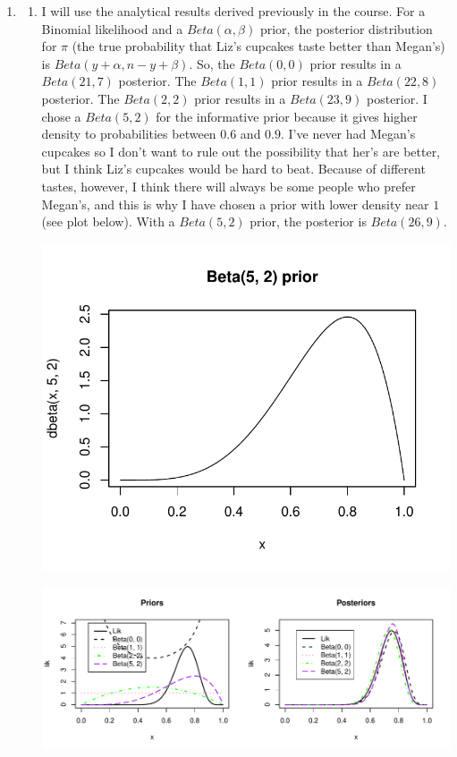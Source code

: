 \documentclass[12pt]{article}\usepackage[]{graphicx}\usepackage[]{color}
\newenvironment{knitrout}{}{} %
\begin{document}
\begin{doublespacing}
\begin{enumerate}
\item \begin{enumerate} 

\item I will use the analytical results derived previously in the course. For a Binomial likelihood and a $Beta(\alpha, \beta)$ prior, the posterior distribution for $\pi$ (the true probability that Liz's cupcakes taste better than Megan's) is $Beta(y + \alpha, n - y + \beta)$. So, the $Beta(0, 0)$ prior results in a $Beta(21, 7)$ posterior. The $Beta(1, 1)$ prior results in a $Beta(22, 8)$ posterior. The $Beta(2, 2)$ prior results in a $Beta(23, 9)$ posterior. I chose a $Beta(5, 2)$ for the informative prior because it gives higher density to probabilities between $0.6$ and $0.9$. I've never had Megan's cupcakes so I don't want to rule out the possibility that her's are better, but I think Liz's cupcakes would be hard to beat. Because of different tastes, however, I think there will always be some people who prefer Megan's, and this is why I have chosen a prior with lower density near $1$ (see plot below). With a $Beta(5, 2)$ prior, the posterior is $Beta(26, 9)$.

\begin{center}
\begin{knitrout}\footnotesize
{}\color{fgcolor}
\includegraphics[width=.5\linewidth]{figure/betainform-1} 

\end{knitrout}
\end{center}

\begin{knitrout}\footnotesize
{}\color{fgcolor}
\includegraphics[width=\linewidth]{figure/plots-1} 


\end{knitrout}
\end{enumerate}
\end{enumerate}
\end{doublespacing}
\end{document}
